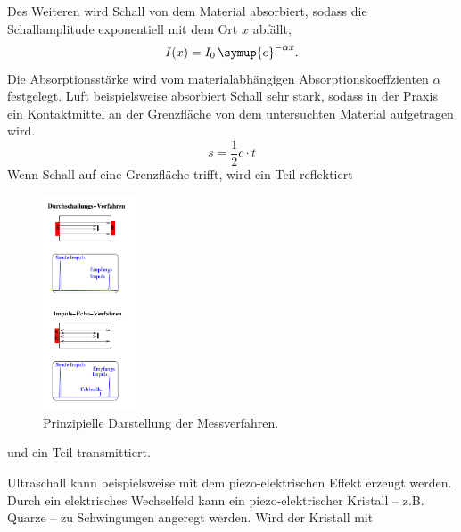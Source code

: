 Des Weiteren wird Schall von dem Material absorbiert, sodass die Schallamplitude exponentiell
mit dem Ort $x$ abfällt;
\begin{equation}
	\label{eqn:dampf}
	I(x) = I_0 \, \symup{e}^{-\alpha x} \mathrm{.}
\end{equation}
Die Absorptionsstärke wird vom materialabhängigen Absorptionskoeffzienten $\alpha$ festgelegt.
Luft beispielsweise absorbiert Schall sehr stark, sodass in der Praxis ein Kontaktmittel an der
Grenzfläche von dem untersuchten Material aufgetragen wird.
\begin{equation}
	\label{eqn:laufzeit}
	s=\frac{1}{2}c\cdot t
\end{equation}
Wenn Schall auf eine Grenzfläche trifft, wird ein Teil reflektiert
\begin{figure}
	\centering
	\includegraphics[width=0.25\textwidth]{Bilder/Messverfahren.png}
	\caption{Prinzipielle Darstellung der Messverfahren. \cite{Anleitung}}
	\label{fig:echo}
\end{figure}
und ein Teil transmittiert.

Ultraschall kann beispielsweise mit dem piezo-elektrischen Effekt erzeugt werden.
Durch ein elektrisches Wechselfeld kann ein piezo-elektrischer Kristall -- z.B. Quarze -- zu
Schwingungen angeregt werden. Wird der Kristall mit

